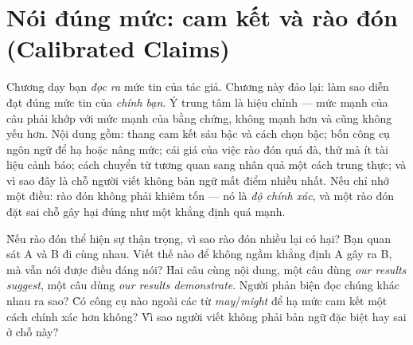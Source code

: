 \documentclass[../../english.tex]{subfiles}
\begin{document}
\chapter{Nói đúng mức: cam kết và rào đón (Calibrated Claims)}

\begin{tomtat}
Chương  dạy bạn \emph{đọc ra} mức tin của tác giả. Chương này đảo lại: làm sao diễn đạt đúng mức tin của \emph{chính bạn}. Ý trung tâm là hiệu chỉnh --- mức mạnh của câu phải khớp với mức mạnh của bằng chứng, không mạnh hơn và cũng không yếu hơn. Nội dung gồm: thang cam kết sáu bậc và cách chọn bậc; bốn công cụ ngôn ngữ để hạ hoặc nâng mức; cái giá của việc rào đón quá đà, thứ mà ít tài liệu cảnh báo; cách chuyển từ tương quan sang nhân quả một cách trung thực; và vì sao đây là chỗ người viết không bản ngữ mất điểm nhiều nhất. Nếu chỉ nhớ một điều: rào đón không phải khiêm tốn --- nó là \emph{độ chính xác}, và một rào đón đặt sai chỗ gây hại đúng như một khẳng định quá mạnh.
\end{tomtat}

\begin{nentang}
\end{nentang}

\begin{khoigoi}
\h{Nếu rào đón thể hiện sự thận trọng, vì sao rào đón nhiều lại có hại?}
\h{Bạn quan sát A và B đi cùng nhau. Viết thế nào để không ngầm khẳng định A gây ra B, mà vẫn nói được điều đáng nói?}
\h{Hai câu cùng nội dung, một câu dùng \emph{our results suggest}, một câu dùng \emph{our results demonstrate}. Người phản biện đọc chúng khác nhau ra sao?}
\h{Có công cụ nào ngoài các từ \emph{may}/\emph{might} để hạ mức cam kết một cách chính xác hơn không?}
\h{Vì sao người viết không phải bản ngữ đặc biệt hay sai ở chỗ này?}
\end{khoigoi}
\end{document}
